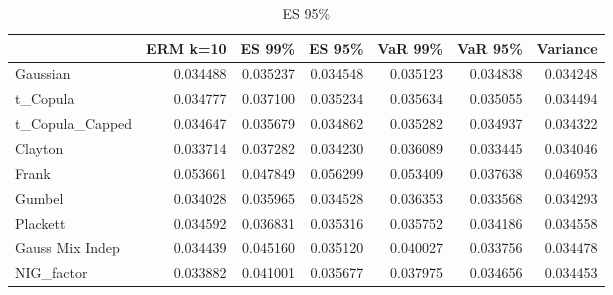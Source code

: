 \begin{table}
        \centering
\begin{tabular}{lrrrrrr}
\toprule
{} &  ERM k=10 &    ES 99\% &    ES 95\% &   VaR 99\% &   VaR 95\% &  Variance \\
\midrule
Gaussian        &  0.034488 &  \color{green}0.035237 &  0.034548 &  \color{green}0.035123 &  0.034838 &  \color{blue}0.034248 \\
t\_Copula        &  0.034777 &  0.037100 &  0.035234 &  0.035634 &  0.035055 &  \color{blue}0.034494 \\
t\_Copula\_Capped &  0.034647 &  0.035679 &  0.034862 &  0.035282 &  0.034937 &  \color{blue}0.034322 \\
Clayton         &  \color{green}0.033714 &  0.037282 &  \color{green}0.034230 &  0.036089 &  \color{red}0.033445 &  \color{green}0.034046 \\
Frank           &  0.053661 &  0.047849 &  0.056299 &  0.053409 &  \color{blue}0.037638 &  0.046953 \\
Gumbel          &  0.034028 &  0.035965 &  0.034528 &  0.036353 &  \color{blue}0.033568 &  0.034293 \\
Plackett        &  0.034592 &  0.036831 &  0.035316 &  0.035752 &  \color{blue}0.034186 &  0.034558 \\
Gauss Mix Indep &  0.034439 &  0.045160 &  0.035120 &  0.040027 &  \color{blue}0.033756 &  0.034478 \\
NIG\_factor      &  \color{blue}0.033882 &  0.041001 &  0.035677 &  0.037975 &  0.034656 &  0.034453 \\
\bottomrule
\end{tabular}
\caption{ES 95\%}
\end{table}


